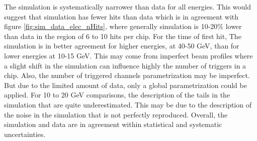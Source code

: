 The simulation is systematically narrower than data for all energies. This would suggest that simulation has fewer hits than data which is in agreement with figure \ref{fig:sim_data_elec_nHits}, where generally simulation is 10-20\% lower than data in the region of 6 to 10 hits per chip. For the time of first hit, The simulation is in better agreement for higher energies, at 40-50 GeV, than for lower energies at 10-15 GeV. This may come from imperfect beam profiles where a slight shift in the simulation can influence highly the number of triggers in a chip. Also, the number of triggered channels parametrization may be imperfect. But due to the limited amount of data, only a global parametrization could be applied. For 10 to 20 GeV comparisons, the description of the tails in the simulation that are quite underestimated. This may be due to the description of the noise in the simulation that is not perfectly reproduced. Overall, the simulation and data are in agreement within statistical and systematic uncertainties.

